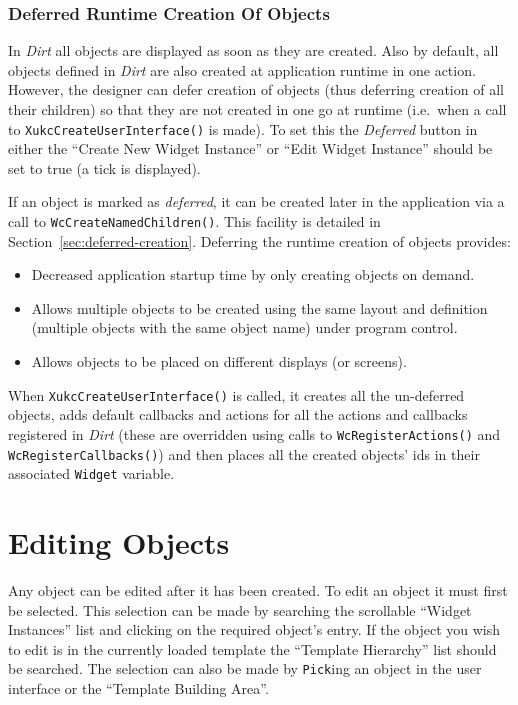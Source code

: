 \subsubsection{Deferred Runtime Creation Of Objects}
In {\em Dirt} all objects are displayed as soon as they are created.
Also by default, all objects defined in {\em Dirt} are also created at
application runtime in one action.  However, the designer can defer creation
of objects (thus deferring creation of all their children) so that they
are not created in one go at runtime (i.e.\ when a call to
{\tt XukcCreateUserInterface()} is made).  To set this the {\em Deferred}
button in either the ``Create New Widget Instance'' or
``Edit Widget Instance'' should be set to true (a tick is displayed).

If an object is marked as {\em deferred}, it can be created later
in the application
via a call to {\tt WcCreateNamedChildren()}.  This facility is detailed in
Section~\ref{sec:deferred-creation}.
Deferring the runtime creation of objects provides:
\begin{itemize}
\item{}
Decreased application startup time by only creating objects on demand.
\item{}
Allows multiple objects to be created using the same layout and definition
(multiple objects with the same object name) under program control.
\item{}
Allows objects to be placed on different displays (or screens).
\end{itemize}
When {\tt XukcCreateUserInterface()} is called, it creates all the un-deferred
objects, adds default callbacks and actions for all the actions and callbacks
registered in {\em Dirt} (these are overridden using calls to
{\tt WcRegisterActions()} and {\tt WcRegisterCallbacks()}) and then places
all the created objects' ids in their associated {\tt Widget} variable.


\section{Editing Objects}
\label{sec:editing-objects}
Any object can be edited after it has been created.  To edit an object it must
first be selected.  This selection can be made by searching the scrollable
``Widget Instances'' list and clicking on the required object's entry.  If
the object you wish to edit is in the currently loaded template the
``Template Hierarchy'' list should be searched.  The
selection can also be made by {\tt Pick}ing an object in the user interface or
the ``Template Building Area''.

